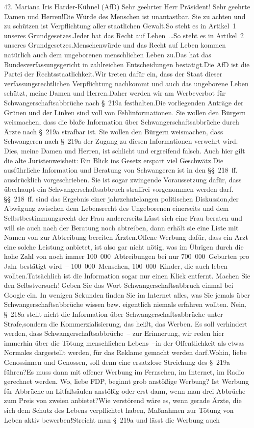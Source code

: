 \documentclass{article}
\begin{document}
	42. Mariana Iris Harder-Kühnel (AfD) Sehr geehrter Herr Präsident! Sehr geehrte Damen und Herren!Die Würde des Menschen ist unantastbar. Sie zu achten und zu schützen ist Verpflichtung aller staatlichen Gewalt.So steht es in Artikel 1 unseres Grundgesetzes.Jeder hat das Recht auf Leben …So steht es in Artikel 2 unseres Grundgesetzes.Menschenwürde und das Recht auf Leben kommen natürlich auch dem ungeborenen menschlichen Leben zu.Das hat das Bundesverfassungsgericht in zahlreichen Entscheidungen bestätigt.Die AfD ist die Partei der Rechtsstaatlichkeit.Wir treten dafür ein, dass der Staat dieser verfassungsrechtlichen Verpflichtung nachkommt und auch das ungeborene Leben schützt, meine Damen und Herren.Daher werden wir am Werbeverbot für Schwangerschaftsabbrüche nach § 219a festhalten.Die vorliegenden Anträge der Grünen und der Linken sind voll von Fehlinformationen. Sie wollen den Bürgern weismachen, dass die bloße Information über Schwangerschaftsabbrüche durch Ärzte nach § 219a strafbar ist. Sie wollen den Bürgern weismachen, dass Schwangeren nach § 219a der Zugang zu diesen Informationen verwehrt wird. Dies, meine Damen und Herren, ist schlicht und ergreifend falsch. Auch hier gilt die alte Juristenweisheit: Ein Blick ins Gesetz erspart viel Geschwätz.Die ausführliche Information und Beratung von Schwangeren ist in den §§ 218 ff. ausdrücklich vorgeschrieben. Sie ist sogar zwingende Voraussetzung dafür, dass überhaupt ein Schwangerschaftsabbruch straffrei vorgenommen werden darf. §§ 218 ff. sind das Ergebnis einer jahrzehntelangen politischen Diskussion,der Abwägung zwischen dem Lebensrecht des Ungeborenen einerseits und dem Selbstbestimmungsrecht der Frau andererseits.Lässt sich eine Frau beraten und will sie auch nach der Beratung noch abtreiben, dann erhält sie eine Liste mit Namen von zur Abtreibung bereiten Ärzten.Offene Werbung dafür, dass ein Arzt eine solche Leistung anbietet, ist also gar nicht nötig, was im Übrigen durch die hohe Zahl von noch immer 100 000 Abtreibungen bei nur 700 000 Geburten pro Jahr bestätigt wird – 100 000 Menschen, 100 000 Kinder, die auch leben wollten.Tatsächlich ist die Information sogar nur einen Klick entfernt. Machen Sie den Selbstversuch! Geben Sie das Wort Schwangerschaftsabbruch einmal bei Google ein. In wenigen Sekunden finden Sie im Internet alles, was Sie jemals über Schwangerschaftsabbrüche wissen bzw. eigentlich niemals erfahren wollten. Nein, § 218a stellt nicht die Information über Schwangerschaftsabbrüche unter Strafe,sondern die Kommerzialisierung, das heißt, das Werben. Es soll verhindert werden, dass Schwangerschaftsabbrüche – zur Erinnerung, wir reden hier immerhin über die Tötung menschlichen Lebens –in der Öffentlichkeit als etwas Normales dargestellt werden, für das Reklame gemacht werden darf.Wohin, liebe Genossinnen und Genossen, soll denn eine ersatzlose Streichung des § 219a führen?Es muss dann mit offener Werbung im Fernsehen, im Internet, im Radio gerechnet werden. Wo, liebe FDP, beginnt grob anstößige Werbung? Ist Werbung für Abbrüche an Litfaßsäulen anstößig oder erst dann, wenn man drei Abbrüche zum Preis von zweien anbietet?Wie verstörend wäre es, wenn gerade Ärzte, die sich dem Schutz des Lebens verpflichtet haben, Maßnahmen zur Tötung von Leben aktiv bewerben!Streicht man § 219a und lässt die Werbung auch 
\end{document}
